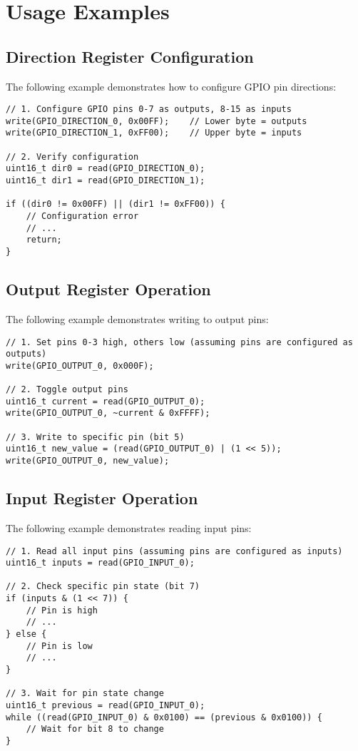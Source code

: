 \section{Usage Examples}

\subsection{Direction Register Configuration}
The following example demonstrates how to configure GPIO pin directions:

\begin{verbatim}
// 1. Configure GPIO pins 0-7 as outputs, 8-15 as inputs
write(GPIO_DIRECTION_0, 0x00FF);    // Lower byte = outputs
write(GPIO_DIRECTION_1, 0xFF00);    // Upper byte = inputs

// 2. Verify configuration
uint16_t dir0 = read(GPIO_DIRECTION_0);
uint16_t dir1 = read(GPIO_DIRECTION_1);

if ((dir0 != 0x00FF) || (dir1 != 0xFF00)) {
    // Configuration error
    // ...
    return;
}
\end{verbatim}

\subsection{Output Register Operation}
The following example demonstrates writing to output pins:

\begin{verbatim}
// 1. Set pins 0-3 high, others low (assuming pins are configured as outputs)
write(GPIO_OUTPUT_0, 0x000F);

// 2. Toggle output pins
uint16_t current = read(GPIO_OUTPUT_0);
write(GPIO_OUTPUT_0, ~current & 0xFFFF);

// 3. Write to specific pin (bit 5)
uint16_t new_value = (read(GPIO_OUTPUT_0) | (1 << 5));
write(GPIO_OUTPUT_0, new_value);
\end{verbatim}

\subsection{Input Register Operation}
The following example demonstrates reading input pins:

\begin{verbatim}
// 1. Read all input pins (assuming pins are configured as inputs)
uint16_t inputs = read(GPIO_INPUT_0);

// 2. Check specific pin state (bit 7)
if (inputs & (1 << 7)) {
    // Pin is high
    // ...
} else {
    // Pin is low
    // ...
}

// 3. Wait for pin state change
uint16_t previous = read(GPIO_INPUT_0);
while ((read(GPIO_INPUT_0) & 0x0100) == (previous & 0x0100)) {
    // Wait for bit 8 to change
}
\end{verbatim}

